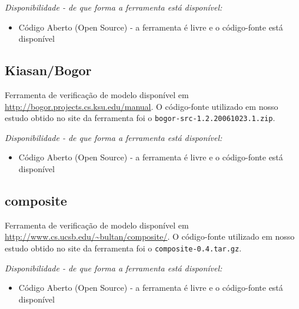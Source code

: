 \begin{description}

  \item {\it Disponibilidade - de que forma a ferramenta está disponível:}
    \begin{itemize}
      \item Código Aberto (Open Source) - a ferramenta é livre e o código-fonte está disponível
    \end{itemize}

\end{description}

\subsection{Kiasan/Bogor}

Ferramenta de verificação de modelo disponível em
\url{http://bogor.projects.cs.ksu.edu/manual}. O código-fonte utilizado em
nosso estudo obtido no site da ferramenta foi o
\texttt{bogor-src-1.2.20061023.1.zip}.

\begin{description}

  \item {\it Disponibilidade - de que forma a ferramenta está disponível:}
    \begin{itemize}
      \item Código Aberto (Open Source) - a ferramenta é livre e o código-fonte está disponível
    \end{itemize}

\end{description}

\subsection{composite}

Ferramenta de verificação de modelo disponível em
\url{http://www.cs.ucsb.edu/~bultan/composite/}. O código-fonte utilizado em
nosso estudo obtido no site da ferramenta foi o \texttt{composite-0.4.tar.gz}.

\begin{description}

  \item {\it Disponibilidade - de que forma a ferramenta está disponível:}
    \begin{itemize}
      \item Código Aberto (Open Source) - a ferramenta é livre e o código-fonte está disponível
    \end{itemize}

\end{description}

